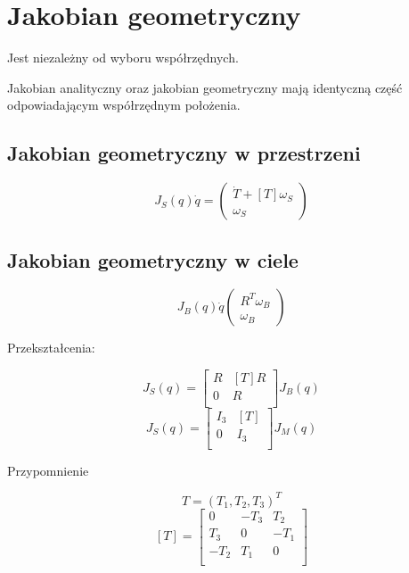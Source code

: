 \documentclass{article}
\newenvironment{kol2}{\noindent \begin{minipage}[t]{0.5\linewidth}}{\end{minipage}}
\begin{document}
\section{Jakobian geometryczny}
Jest niezależny od wyboru współrzędnych.

Jakobian analityczny oraz jakobian geometryczny mają identyczną część odpowiadającym współrzędnym położenia.

\begin{kol2}
    \subsection{Jakobian geometryczny w przestrzeni}

    \Large
    $$  J_S(q)\dot{q} = \left( \begin{matrix}
            \dot{T} + [T] \omega_S \\
            \omega_S
        \end{matrix} \right)
    $$
    \normalsize
\end{kol2}
\begin{kol2}
    \subsection{Jakobian geometryczny w ciele}

    \Large
    $$  J_B(q)\dot{q} \left( \begin{matrix}
            R^T \omega_B \\
            \omega_B
        \end{matrix} \right)
    $$
    \normalsize
\end{kol2}

\vspace{1cm}
\begin{kol2}
    Przekształcenia:

    \large
    $$  J_S(q) = \left[ \begin{matrix}
        R   & [T]R  \\
        0   &  R    \\
    \end{matrix} \right] J_B(q)
    $$
    \normalsize
    \large
    $$  J_S(q) = \left[ \begin{matrix}
        I_3 & [T] \\
        0   & I_3 \\
    \end{matrix} \right] J_M(q)
    $$
    \normalsize
\end{kol2}
\begin{kol2}
    Przypomnienie

    $$ T = (T_1, T_2, T_3)^T $$
    $$ [T] = \left[ \begin{matrix}
        0   &   -T_3    &   T_2 \\
        T_3 &   0       &   -T_1\\
        -T_2&   T_1     &   0   \\
    \end{matrix} \right]
    $$
\end{kol2}
\vspace{0.5cm}
\end{document}
